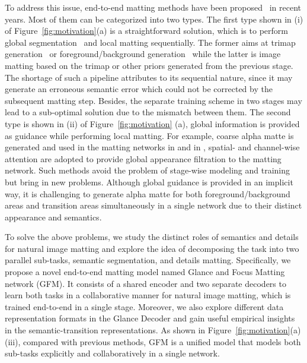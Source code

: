 \documentclass[twocolumn]{svjour3}
\begin{document}
To address this issue, end-to-end matting methods have been proposed~\citep{chen2018semantic,zhang2019late,shen2016deep,Qiao_2020_CVPR,liu2020boosting} in recent years. Most of them can be categorized into two types. The first type shown in (i) of Figure~\ref{fig:motivation}(a) is a straightforward solution, which is to perform global segmentation~\citep{aksoy2018semantic} and local matting sequentially. The former aims at trimap generation~\citep{chen2018semantic,shen2016deep} or foreground/background generation~\citep{zhang2019late} while the latter is image matting based on the trimap or other priors generated from the previous stage. The shortage of such a pipeline attributes to its sequential nature, since it may generate an erroneous semantic error which could not be corrected by the subsequent matting step. Besides, the separate training scheme in two stages may lead to a sub-optimal solution due to the mismatch between them. The second type is shown in (ii) of Figure~\ref{fig:motivation} (a), global information is provided as guidance while performing local matting. For example, coarse alpha matte is generated and used in the matting networks in \citep{liu2020boosting} and in \citep{Qiao_2020_CVPR}, spatial- and channel-wise attention are adopted to provide global appearance filtration to the matting network. Such methods avoid the problem of stage-wise modeling and training but bring in new problems. Although global guidance is provided in an implicit way, it is challenging to generate alpha matte for both foreground/background areas and transition areas simultaneously in a single network due to their distinct appearance and semantics. 

To solve the above problems, we study the distinct roles of semantics and details for natural image matting and explore the idea of decomposing the task into two parallel sub-tasks, semantic segmentation, and details matting. Specifically, we propose a novel end-to-end matting model named Glance and Focus Matting network (GFM). It consists of a shared encoder and two separate decoders to learn both tasks in a collaborative manner for natural image matting, which is trained end-to-end in a single stage. Moreover, we also explore different data representation formats in the Glance Decoder and gain useful empirical insights in the semantic-transition representations. As shown in Figure~\ref{fig:motivation}(a)(iii), compared with previous methods, GFM is a unified model that models both sub-tasks explicitly and collaboratively in a single network.
\end{document}
